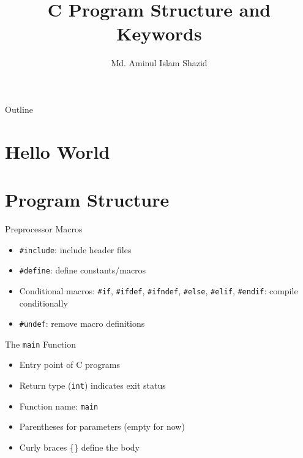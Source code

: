 \documentclass[12pt, aspectratio=169]{beamer}
\title{C Program Structure and Keywords}
\author{Md. Aminul Islam Shazid}
\date{}
\begin{document}
    {
		\addtocounter{framenumber}{-2}    %

		\begin{frame}
			\titlepage
		\end{frame}

		\begin{frame}{Outline}
            \vfill
			\tableofcontents[subsectionstyle=hide]
            \vfill
		\end{frame}
	}

    \section{Hello World}





    \section{Program Structure}

    \begin{frame}{Preprocessor Macros}
    \begin{itemize}
        \item \texttt{\#include}: include header files
        \item \texttt{\#define}: define constants/macros
        \item Conditional macros: \texttt{\#if}, \texttt{\#ifdef}, \texttt{\#ifndef}, \texttt{\#else}, \texttt{\#elif}, \texttt{\#endif}: compile conditionally
        \item \texttt{\#undef}: remove macro definitions
    \end{itemize}
    \end{frame}


    \begin{frame}{The \texttt{main} Function}
        \begin{itemize}
            \item Entry point of C programs
            \item Return type (\texttt{int}) indicates exit status
            \item Function name: \texttt{main}
            \item Parentheses for parameters (empty for now)
            \item Curly braces \{\} define the body
        \end{itemize}
    \end{frame}
\end{document}
